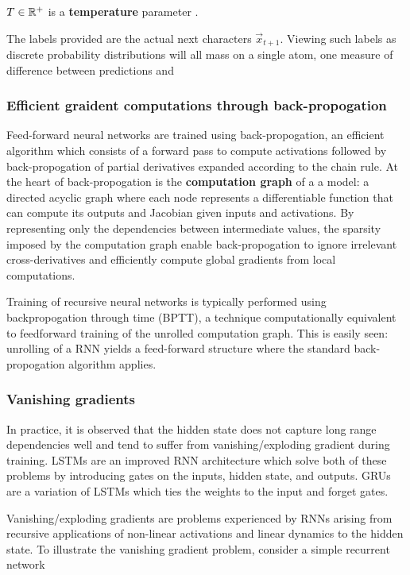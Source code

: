 $T \in \mathbb{R}^+$ is a \textbf{temperature} parameter .

The labels provided are the actual next characters $\vec{x}_{t+1}$. Viewing
such labels as discrete probability distributions will all mass on a single atom,
one measure of difference between predictions and 

\subsubsection{Efficient graident computations through back-propogation}

Feed-forward neural networks are trained using back-propogation, an efficient
algorithm which consists of a forward pass to compute activations followed by
back-propogation of partial derivatives expanded according to the chain
rule. At the heart of back-propogation is the
\textbf{computation graph} of a a model: a directed acyclic graph where each
node represents a differentiable function that can compute its outputs and
Jacobian given inputs and activations. By representing only
the dependencies between intermediate values, the sparsity imposed by the
computation graph enable back-propogation to ignore irrelevant
cross-derivatives and efficiently compute global gradients from local
computations.


Training of recursive neural networks is typically performed using
backpropogation through time (BPTT)\cite{at}, a technique computationally
equivalent to feedforward training of the unrolled computation graph. This is
easily seen: unrolling of a RNN yields a feed-forward structure where the
standard back-propogation algorithm applies.




\subsubsection{Vanishing gradients}

In practice, it is observed that the hidden state does not capture long range
dependencies well and tend to suffer from vanishing/exploding gradient during
training. LSTMs are an improved RNN architecture which solve both of these
problems by introducing gates on the inputs, hidden state, and outputs. GRUs are
a variation of LSTMs which ties the weights to the input and forget gates.

Vanishing/exploding gradients \cite{Bengio1994} are problems experienced by
RNNs arising from recursive applications of non-linear activations and linear dynamics
to the hidden state. To illustrate the vanishing gradient problem, consider
a simple recurrent network

